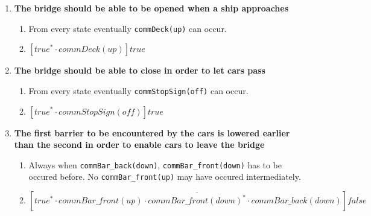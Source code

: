\begin{enumerate}
	\item \textbf{The bridge should be able to be opened when a ship approaches}
	\begin{enumerate}
		\item From every state eventually \texttt{commDeck(up)} can occur.
		\item $[true^* \cdot commDeck(up)]true$
	\end{enumerate}

	\item \textbf{The bridge should be able to close in order to let cars pass}
	\begin{enumerate}
		\item From every state eventually \texttt{commStopSign(off)} can occur.
		\item $[true^* \cdot commStopSign(off)]true$
	\end{enumerate}

	\item \textbf{The first barrier to be encountered by the cars is lowered earlier than the second in order to enable cars to leave the bridge}
	\begin{enumerate}
		\item Always when \texttt{commBar\_back(down)}, \texttt{commBar\_front(down)} has to be occured before. No \texttt{commBar\_front(up)} may have occured intermediately.
		\item $[true^* \cdot commBar\_front(up) \cdot \overline{commBar\_front(down)^{*}} \cdot commBar\_back(down)]false$\\
	\end{enumerate}



\end{enumerate}
